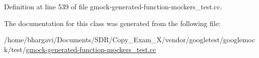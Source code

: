 Definition at line 539 of file gmock-\/generated-\/function-\/mockers\+\_\+test.\+cc.



The documentation for this class was generated from the following file\+:\begin{DoxyCompactItemize}
\item 
/home/bhargavi/\+Documents/\+S\+D\+R/\+Copy\+\_\+\+Exam\+\_\+X/vendor/googletest/googlemock/test/\hyperlink{gmock-generated-function-mockers__test_8cc}{gmock-\/generated-\/function-\/mockers\+\_\+test.\+cc}\end{DoxyCompactItemize}
